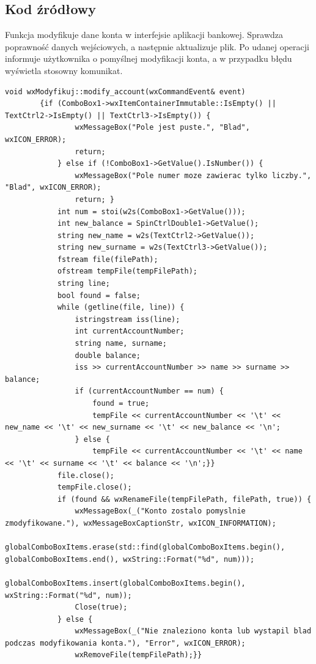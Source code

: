 \documentclass[a4paper,12pt]{article}
\begin{document}
	\subsection{Kod źródłowy}
	Funkcja modyfikuje dane konta w interfejsie aplikacji bankowej. Sprawdza poprawność danych wejściowych, a następnie aktualizuje plik. Po udanej operacji informuje użytkownika o pomyślnej modyfikacji konta, a w przypadku błędu wyświetla stosowny komunikat.
	\begin{lstlisting}
void wxModyfikuj::modify_account(wxCommandEvent& event)
		{if (ComboBox1->wxItemContainerImmutable::IsEmpty() || TextCtrl2->IsEmpty() || TextCtrl3->IsEmpty()) {
				wxMessageBox("Pole jest puste.", "Blad", wxICON_ERROR);
				return;
			} else if (!ComboBox1->GetValue().IsNumber()) {
				wxMessageBox("Pole numer moze zawierac tylko liczby.", "Blad", wxICON_ERROR);
				return;	}
			int num = stoi(w2s(ComboBox1->GetValue()));
			int new_balance = SpinCtrlDouble1->GetValue();
			string new_name = w2s(TextCtrl2->GetValue());
			string new_surname = w2s(TextCtrl3->GetValue());
			fstream file(filePath);
			ofstream tempFile(tempFilePath);
			string line;
			bool found = false;
			while (getline(file, line)) {
				istringstream iss(line);
				int currentAccountNumber;
				string name, surname;
				double balance;
				iss >> currentAccountNumber >> name >> surname >> balance;
				if (currentAccountNumber == num) {
					found = true;
					tempFile << currentAccountNumber << '\t' << new_name << '\t' << new_surname << '\t' << new_balance << '\n';
				} else {
					tempFile << currentAccountNumber << '\t' << name << '\t' << surname << '\t' << balance << '\n';}}
			file.close();
			tempFile.close();
			if (found && wxRenameFile(tempFilePath, filePath, true)) {
				wxMessageBox(_("Konto zostalo pomyslnie zmodyfikowane."), wxMessageBoxCaptionStr, wxICON_INFORMATION);
				globalComboBoxItems.erase(std::find(globalComboBoxItems.begin(), globalComboBoxItems.end(), wxString::Format("%d", num)));
				globalComboBoxItems.insert(globalComboBoxItems.begin(), wxString::Format("%d", num));
				Close(true);
			} else {
				wxMessageBox(_("Nie znaleziono konta lub wystapil blad podczas modyfikowania konta."), "Error", wxICON_ERROR);
				wxRemoveFile(tempFilePath);}}
	\end{lstlisting}
\end{document}
